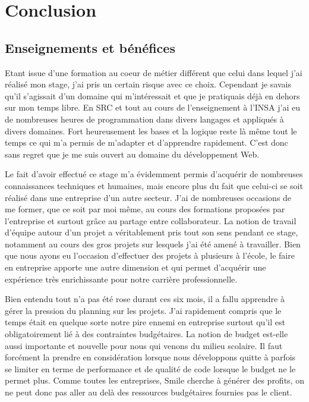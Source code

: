 \documentclass[a4paper,11pt,twoside]{report}
\begin{document}
    
\chapter*{Conclusion}
  \section*{Enseignements et bénéfices}
  Etant issue d'une formation au coeur de métier différent que celui dans lequel j'ai réalisé mon stage, j'ai pris un certain risque avec ce choix. Cependant je savais qu'il s'agissait d'un domaine qui m'intéressait et que je pratiquais déjà en dehors sur mon temps libre. En SRC et tout au cours de l'enseignement à l'INSA j'ai eu de nombreuses heures de programmation dans divers langages et appliqués à divers domaines. Fort heureusement les bases et la logique reste là même tout le temps ce qui m'a permis de m'adapter et d'apprendre rapidement. C'est donc sans regret que je me suis ouvert au domaine du développement Web.
  
  Le fait d'avoir effectué ce stage m'a évidemment permis d'acquérir de nombreuses connaissances techniques et humaines, mais encore plus du fait que celui-ci se soit réalisé dans une entreprise d'un autre secteur. J'ai de nombreuses occasions de me former, que ce soit par moi même, au cours des formations proposées par l'entreprise et surtout grâce au partage entre collaborateur. La notion de travail d'équipe autour d'un projet a véritablement pris tout son sens pendant ce stage, notamment au cours des gros projets sur lesquels j'ai été amené à travailler. Bien que nous ayons eu l'occasion d'effectuer des projets à plusieurs à l'école, le faire en entreprise apporte une autre dimension et qui permet d'acquérir une expérience très enrichissante pour notre carrière professionnelle.
  
  Bien entendu tout n'a pas été rose durant ces six mois, il a fallu apprendre à gérer la pression du planning sur les projets. J'ai rapidement compris que le temps était en quelque sorte notre pire ennemi en entreprise surtout qu'il est obligatoirement lié à des contraintes budgétaires. La notion de budget est-elle aussi importante et nouvelle pour nous qui venons du milieu scolaire. Il faut forcément la prendre en considération lorsque nous développons quitte à parfois se limiter en terme de performance et de qualité de code lorsque le budget ne le permet plus. Comme toutes les entreprises, Smile cherche à générer des profits, on ne peut donc pas aller au delà des ressources budgétaires fournies pas le client.
  
\end{document}
